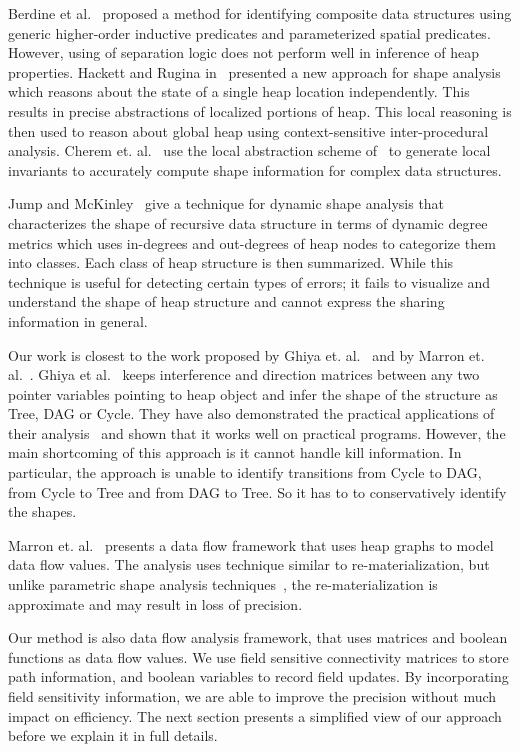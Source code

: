 \documentclass[runningheads,a4paper]{llncs}
\begin{document}
Berdine et al.~\cite{berdine07shape} proposed a method for
identifying composite data structures using generic
higher-order inductive predicates and parameterized spatial
predicates.  However, using of separation logic does not
perform well in inference of heap properties.  Hackett and
Rugina in~\cite{hackett05region} presented a new approach for
shape analysis which reasons about the state of a single heap
location independently. This results in precise abstractions
of localized portions of heap. This local reasoning is then
used to reason about global heap using context-sensitive
inter-procedural analysis.  Cherem
et. al.~\cite{cherem07doubly} use the local abstraction
scheme of~\cite{hackett05region} to generate local invariants
to accurately compute shape information for complex data
structures.  

Jump and McKinley~\cite{maria09dynamic} give a technique for
dynamic shape analysis that characterizes the shape of
recursive data structure in terms of dynamic degree metrics
which uses in-degrees and out-degrees of heap nodes to
categorize them into classes. Each class of heap structure is
then summarized. While this technique is useful for detecting
certain types of errors; it fails to visualize and understand
the shape of heap structure and cannot express the sharing
information in general.

Our work is closest to the work proposed by Ghiya
et. al.~\cite{Ghiya96} and by Marron
et. al.~\cite{marron06static}.  Ghiya et al.~\cite{Ghiya96}
keeps interference and direction matrices between any two
pointer variables pointing to heap object and infer the shape
of the structure as Tree, DAG or Cycle. They have also
demonstrated the practical applications of their
analysis~\cite{Ghiya96practicaltechniques,Ghiya98a,Ghiya98b} and shown that it works well on practical
programs. However, the main shortcoming of this approach is
it cannot handle kill information. In particular, the
approach is unable to identify transitions from Cycle to DAG,
from Cycle to Tree and from DAG to Tree. So it has to to
conservatively identify the shapes.

Marron et. al.~\cite{marron06static} presents a data flow
framework that uses heap graphs to model data flow
values. The analysis uses technique similar to
re-materialization, but unlike parametric shape analysis
techniques~\cite{Sagiv99,Sagiv02toplas}, the
re-materialization is approximate and may result in loss of
precision. 

Our method is also data flow analysis framework, that uses
matrices and boolean functions as data flow values. We use
field sensitive connectivity matrices to store path
information, and boolean variables to record field
updates. By incorporating field sensitivity information, we
are able to improve the precision without much impact on
efficiency. The next section presents a simplified view of
our approach before we explain it in full details.
\end{document}

